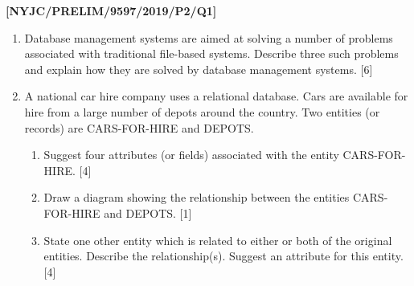 \item \textbf{{[}NYJC/PRELIM/9597/2019/P2/Q1{]} }
\begin{enumerate}
\item Database management systems are aimed at solving a number of problems
associated with traditional file-based systems. Describe three such
problems and explain how they are solved by database management systems.
\hfill{} {[}6{]}
\item A national car hire company uses a relational database. Cars are available
for hire from a large number of depots around the country. Two entities
(or records) are CARS-FOR-HIRE and DEPOTS.
\begin{enumerate}
\item Suggest four attributes (or fields) associated with the entity CARS-FOR-HIRE.
\hfill{}{[}4{]}
\item Draw a diagram showing the relationship between the entities CARS-FOR-HIRE
and DEPOTS. \hfill{}{[}1{]}
\item State one other entity which is related to either or both of the original
entities. Describe the relationship(s). Suggest an attribute for this
entity. \hfill{}{[}4{]}
\end{enumerate}
\end{enumerate}